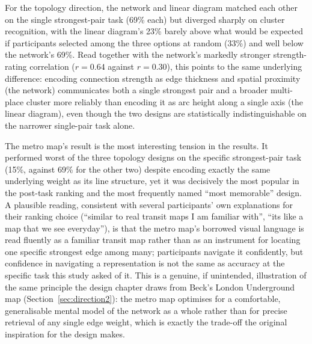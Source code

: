 \documentclass[logo,msc]{infthesis}
\begin{document}
For the topology direction, the network and linear diagram matched each other on the single strongest-pair task (69\% each) but diverged sharply on cluster recognition, with the linear diagram's 23\% barely above what would be expected if participants selected among the three options at random (33\%) and well below the network's 69\%. Read together with the network's markedly stronger strength-rating correlation ($r=0.64$ against $r=0.30$), this points to the same underlying difference: encoding connection strength as edge thickness and spatial proximity (the network) communicates both a single strongest pair and a broader multi-place cluster more reliably than encoding it as arc height along a single axis (the linear diagram), even though the two designs are statistically indistinguishable on the narrower single-pair task alone.

The metro map's result is the most interesting tension in the results. It performed worst of the three topology designs on the specific strongest-pair task (15\%, against 69\% for the other two) despite encoding exactly the same underlying weight as its line structure, yet it was decisively the most popular in the post-task ranking and the most frequently named ``most memorable'' design. A plausible reading, consistent with several participants' own explanations for their ranking choice (``similar to real transit maps I am familiar with'', ``its like a map that we see everyday''), is that the metro map's borrowed visual language is read fluently as a familiar transit map rather than as an instrument for locating one specific strongest edge among many; participants navigate it confidently, but confidence in navigating a representation is not the same as accuracy at the specific task this study asked of it. This is a genuine, if unintended, illustration of the same principle the design chapter draws from Beck's London Underground map (Section~\ref{sec:direction2}): the metro map optimises for a comfortable, generalisable mental model of the network as a whole rather than for precise retrieval of any single edge weight, which is exactly the trade-off the original inspiration for the design makes.
\end{document}
